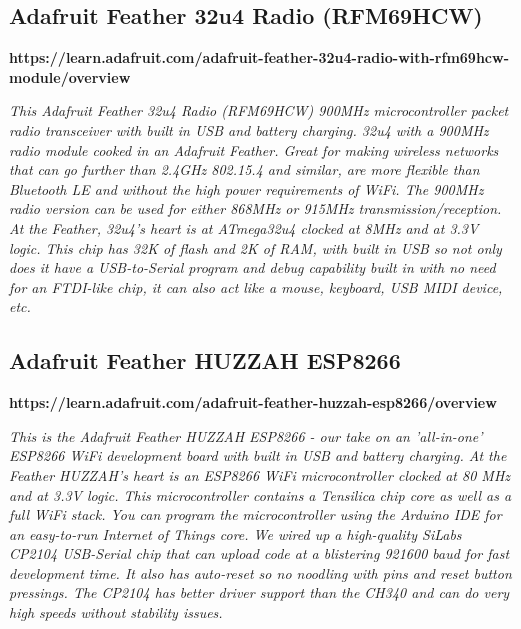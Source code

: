 
\subsection{Adafruit Feather 32u4 Radio (RFM69HCW)}

\begin{mdframed}[	linecolor=black, outerlinewidth=5pt]
	\textbf{https://learn.adafruit.com/adafruit-feather-32u4-radio-with-rfm69hcw-module/overview} 
	
	\small
	\textit{This Adafruit Feather 32u4 Radio (RFM69HCW) 900MHz microcontroller packet radio transceiver with built in USB and battery charging. 32u4 with a 900MHz radio module cooked in an Adafruit Feather. Great for making wireless networks that can go further than 2.4GHz 802.15.4 and similar, are more flexible than Bluetooth LE and without the high power requirements of WiFi. The 900MHz radio version can be used for either 868MHz or 915MHz transmission/reception. At the Feather, 32u4's heart is at ATmega32u4 clocked at 8MHz and at 3.3V logic. This chip has 32K of flash and 2K of RAM, with built in USB so not only does it have a USB-to-Serial program and debug capability built in with no need for an FTDI-like chip, it can also act like a mouse, keyboard, USB MIDI device, etc.}	
\end{mdframed}



\subsection{Adafruit Feather HUZZAH ESP8266}


\begin{mdframed}[	linecolor=black, outerlinewidth=5pt]
	\textbf{https://learn.adafruit.com/adafruit-feather-huzzah-esp8266/overview} 
	
	\small
	\textit{This is the Adafruit Feather HUZZAH ESP8266 - our take on an 'all-in-one' ESP8266 WiFi development board with built in USB and battery charging. At the Feather HUZZAH's heart is an ESP8266 WiFi microcontroller clocked at 80 MHz and at 3.3V logic. This microcontroller contains a Tensilica chip core as well as a full WiFi stack. You can program the microcontroller using the Arduino IDE for an easy-to-run Internet of Things core. We wired up a high-quality SiLabs CP2104 USB-Serial chip that can upload code at a blistering 921600 baud for fast development time. It also has auto-reset so no noodling with pins and reset button pressings. The CP2104 has better driver support than the CH340 and can do very high speeds without stability issues.}	
\end{mdframed}



